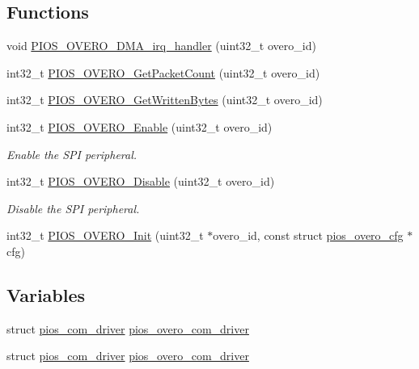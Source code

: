 \subsection*{\-Functions}
\begin{DoxyCompactItemize}
\item 
void \hyperlink{group___p_i_o_s___o_v_e_r_o_ga33d7651a225f8feaebee0da7b806d6f3}{\-P\-I\-O\-S\-\_\-\-O\-V\-E\-R\-O\-\_\-\-D\-M\-A\-\_\-irq\-\_\-handler} (uint32\-\_\-t overo\-\_\-id)
\item 
int32\-\_\-t \hyperlink{group___p_i_o_s___o_v_e_r_o_gaca2a7dbfbba27c8016063572c884f0fe}{\-P\-I\-O\-S\-\_\-\-O\-V\-E\-R\-O\-\_\-\-Get\-Packet\-Count} (uint32\-\_\-t overo\-\_\-id)
\item 
int32\-\_\-t \hyperlink{group___p_i_o_s___o_v_e_r_o_ga964b1603e8379e322e04ae308d4f931c}{\-P\-I\-O\-S\-\_\-\-O\-V\-E\-R\-O\-\_\-\-Get\-Written\-Bytes} (uint32\-\_\-t overo\-\_\-id)
\item 
int32\-\_\-t \hyperlink{group___p_i_o_s___o_v_e_r_o_gaa548fd4048405d2ea1016f302bd077fa}{\-P\-I\-O\-S\-\_\-\-O\-V\-E\-R\-O\-\_\-\-Enable} (uint32\-\_\-t overo\-\_\-id)
\begin{DoxyCompactList}\small\item\em \-Enable the \-S\-P\-I peripheral. \end{DoxyCompactList}\item 
int32\-\_\-t \hyperlink{group___p_i_o_s___o_v_e_r_o_ga4ea04c150565308d37d3df5166c2ec71}{\-P\-I\-O\-S\-\_\-\-O\-V\-E\-R\-O\-\_\-\-Disable} (uint32\-\_\-t overo\-\_\-id)
\begin{DoxyCompactList}\small\item\em \-Disable the \-S\-P\-I peripheral. \end{DoxyCompactList}\item 
int32\-\_\-t \hyperlink{group___p_i_o_s___o_v_e_r_o_ga6aa066f1ee4dee8fd2766d10f9833a97}{\-P\-I\-O\-S\-\_\-\-O\-V\-E\-R\-O\-\_\-\-Init} (uint32\-\_\-t $\ast$overo\-\_\-id, const struct \hyperlink{structpios__overo__cfg}{pios\-\_\-overo\-\_\-cfg} $\ast$cfg)
\end{DoxyCompactItemize}
\subsection*{\-Variables}
\begin{DoxyCompactItemize}
\item 
struct \hyperlink{structpios__com__driver}{pios\-\_\-com\-\_\-driver} \hyperlink{group___p_i_o_s___o_v_e_r_o_ga07e1a9093b33ec66c4e896e83834bfd6}{pios\-\_\-overo\-\_\-com\-\_\-driver}
\item 
struct \hyperlink{structpios__com__driver}{pios\-\_\-com\-\_\-driver} \hyperlink{group___p_i_o_s___o_v_e_r_o_ga07e1a9093b33ec66c4e896e83834bfd6}{pios\-\_\-overo\-\_\-com\-\_\-driver}
\end{DoxyCompactItemize}


